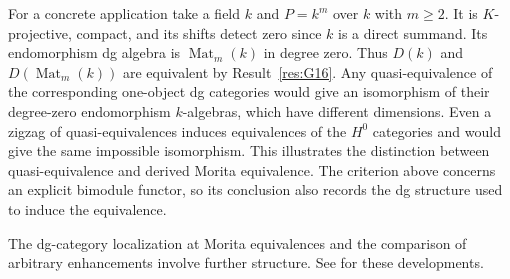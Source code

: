 For a concrete application take a field \(k\) and \(P=k^m\)
over \(k\) with \(m\geq2\). It is \(K\)-projective, compact,
and its shifts detect zero since \(k\) is a direct summand.
Its endomorphism dg algebra is \(\operatorname{Mat}_m(k)\)
in degree zero. Thus \(D(k)\) and \(D(\operatorname{Mat}_m(k))\)
are equivalent by Result~\ref{res:G16}. Any quasi-equivalence
of the corresponding one-object dg categories would give an
isomorphism of their degree-zero endomorphism \(k\)-algebras,
which have different dimensions. Even a zigzag of
quasi-equivalences induces equivalences of the \(H^0\) categories
and would give the same impossible isomorphism. This illustrates
the distinction between quasi-equivalence and derived Morita
equivalence. The criterion above concerns an explicit bimodule
functor, so its conclusion also records the dg structure used
to induce the equivalence.

The dg-category localization at Morita equivalences and the
comparison of arbitrary enhancements involve further structure.
See \cite[\S\S3.8, 4.5]{keller} for these developments.
